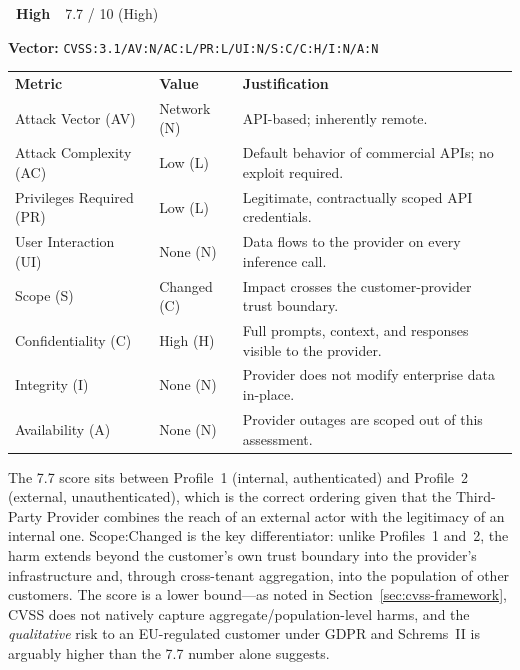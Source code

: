 \documentclass[12pt, a4paper]{report}
\newcommand{\badgehigh}{\colorbox{warn}{\color{white}\small\textbf{~High~}}}
\newcommand{\cvssvec}[1]{\texttt{\small #1}}
\begin{document}
\begin{cvssbox}{\badgehigh\ 7.7 / 10 (High)}
\vspace{2pt}
\begin{center}
\textbf{Vector:}\enspace
\cvssvec{CVSS:3.1/AV:N/AC:L/PR:L/UI:N/S:C/C:H/I:N/A:N}
\end{center}
\vspace{8pt}
\begin{tabular}{L{3.4cm} L{2.2cm} L{7.8cm}}
  \color{white}\small\textbf{Metric} &
  \color{white}\small\textbf{Value} &
  \color{white}\small\textbf{Justification} \\
  \small Attack Vector (AV)     & \small Network (N) & \small API-based; inherently remote. \\
  \small Attack Complexity (AC) & \small Low (L)     & \small Default behavior of commercial APIs; no exploit required. \\
  \small Privileges Required (PR)  & \small Low (L)  & \small Legitimate, contractually scoped API credentials. \\
  \small User Interaction (UI)  & \small None (N)    & \small Data flows to the provider on every inference call. \\
  \small Scope (S)              & \small Changed (C) & \small Impact crosses the customer-provider trust boundary. \\
  \small Confidentiality (C)    & \small High (H)    & \small Full prompts, context, and responses visible to the provider. \\
  \small Integrity (I)          & \small None (N)    & \small Provider does not modify enterprise data in-place. \\
  \small Availability (A)       & \small None (N)    & \small Provider outages are scoped out of this assessment. \\
\end{tabular}
\vspace{6pt}

\small The 7.7 score sits between Profile~1 (internal, authenticated) and
Profile~2 (external, unauthenticated), which is the correct ordering
given that the Third-Party Provider combines the reach of an external
actor with the legitimacy of an internal one. Scope:Changed is the key
differentiator: unlike Profiles~1 and~2, the harm extends beyond the
customer's own trust boundary into the provider's infrastructure and,
through cross-tenant aggregation, into the population of other customers.
The score is a lower bound---as noted in Section~\ref{sec:cvss-framework},
CVSS does not natively capture aggregate/population-level harms, and the
\emph{qualitative} risk to an EU-regulated customer under GDPR and
Schrems~II is arguably higher than the 7.7 number alone suggests.
\end{cvssbox}
\end{document}
